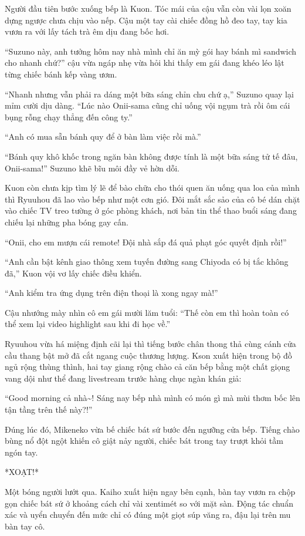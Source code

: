 ﻿\documentclass[../main.tex]{subfiles}
\begin{document}
\ct

Người đầu tiên bước xuống bếp là Kuon. Tóc mái của cậu vẫn còn vài lọn xoăn dựng ngược chưa chịu vào nếp. Cậu một tay cài chiếc đồng hồ đeo tay, tay kia vươn ra với lấy tách trà êm dịu đang bốc hơi.

``Suzuno này, anh tưởng hôm nay nhà mình chỉ ăn mỳ gói hay bánh mì sandwich cho nhanh chứ?'' cậu vừa ngáp nhẹ vừa hỏi khi thấy em gái đang khéo léo lật từng chiếc bánh kếp vàng ươm.

``Nhanh nhưng vẫn phải ra dáng một bữa sáng chỉn chu chứ ạ,'' Suzuno quay lại mỉm cười dịu dàng. ``Lúc nào Onii-sama cũng chỉ uống vội ngụm trà rồi ôm cái bụng rỗng chạy thẳng đến công ty.''

``Anh có mua sẵn bánh quy để ở bàn làm việc rồi mà.''

``Bánh quy khô khốc trong ngăn bàn không được tính là một bữa sáng tử tế đâu, Onii-sama!'' Suzuno khẽ bĩu môi đầy vẻ hờn dỗi.

Kuon còn chưa kịp tìm lý lẽ để bào chữa cho thói quen ăn uống qua loa của mình thì Ryuuhou đã lao vào bếp như một cơn gió. Đôi mắt sắc sảo của cô bé dán chặt vào chiếc TV treo tường ở góc phòng khách, nơi bản tin thể thao buổi sáng đang chiếu lại những pha bóng gay cấn.

``Onii, cho em mượn cái remote! Đội nhà sắp đá quả phạt góc quyết định rồi!''

``Anh cần bật kênh giao thông xem tuyến đường sang Chiyoda có bị tắc không đã,'' Kuon vội vơ lấy chiếc điều khiển.

``Anh kiểm tra ứng dụng trên điện thoại là xong ngay mà!''

Cậu nhướng mày nhìn cô em gái mười lăm tuổi: ``Thế còn em thì hoàn toàn có thể xem lại video highlight sau khi đi học về.''

Ryuuhou vừa há miệng định cãi lại thì tiếng bước chân thong thả cùng cánh cửa cầu thang bật mở đã cắt ngang cuộc thương lượng. Kson xuất hiện trong bộ đồ ngủ rộng thùng thình, hai tay giang rộng chào cả căn bếp bằng một chất giọng vang dội như thể đang livestream trước hàng chục ngàn khán giả:

``Good morning cả nhà\~{}! Sáng nay bếp nhà mình có món gì mà mùi thơm bốc lên tận tầng trên thế này?!''

Đúng lúc đó, Mikeneko vừa bế chiếc bát sứ bước đến ngưỡng cửa bếp. Tiếng chào bùng nổ đột ngột khiến cô giật nảy người, chiếc bát trong tay trượt khỏi tầm ngón tay.

*XOẠT!*

Một bóng người lướt qua. Kaiho xuất hiện ngay bên cạnh, bàn tay vươn ra chộp gọn chiếc bát sứ ở khoảng cách chỉ vài xentimét so với mặt sàn. Động tác chuẩn xác và uyển chuyển đến mức chỉ có đúng một giọt súp văng ra, đậu lại trên mu bàn tay cô.
\end{document}
